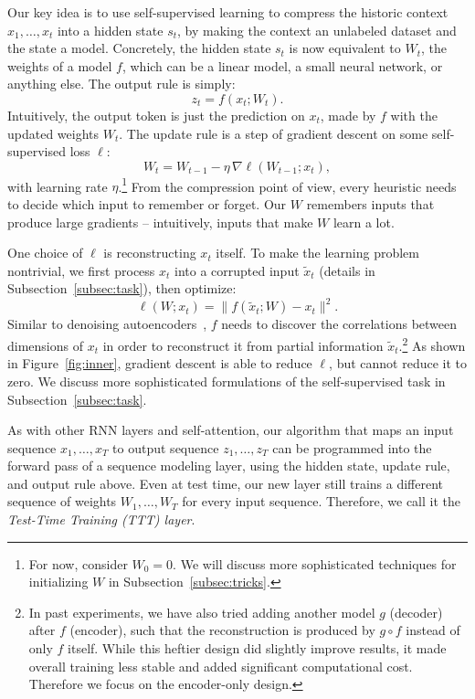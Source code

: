 \documentclass{article}
\begin{document}
Our key idea is to use self-supervised learning to compress the historic context $x_1,\dots,x_t$ into a hidden state $s_t$, by making the context an unlabeled dataset and the state a model.
Concretely, the hidden state $s_t$ is now equivalent to $W_t$, the weights of a model $f$, which can be a linear model, a small neural network, or anything else.
The output rule is simply:
\begin{equation}
\label{eq:output_naive}
z_t = f(x_t; W_t).
\end{equation}
Intuitively, the output token is just the prediction on $x_t$, made by $f$ with the updated weights $W_t$.
The update rule is a step of gradient descent on some self-supervised loss $\ell$: 
\begin{equation}
\label{eq:update_naive}
W_t = W_{t-1} - \eta\,\nabla\ell(W_{t-1}; x_t),
\end{equation}
with learning rate $\eta$.\footnote{\label{footnote:2}
For now, consider $W_0 = 0$. We will discuss more sophisticated techniques for initializing $W$ in Subsection~\ref{subsec:tricks}.}
From the compression point of view, every heuristic needs to decide which input to remember or forget. Our $W$ remembers inputs that produce large gradients -- intuitively, inputs that make $W$ learn a lot.

One choice of $\ell$ is reconstructing $x_t$ itself. 
To make the learning problem nontrivial, we first process $x_t$ into a corrupted input $\tilde{x}_t$ (details in Subsection~\ref{subsec:task}), then optimize:
\begin{equation}
\label{eq:recon}
\ell(W; x_t) = \| f(\tilde{x}_t; W) - x_t \|^2.
\end{equation}
Similar to denoising autoencoders~\cite{denoisingautoencoder}, $f$ needs to discover the correlations between dimensions of $x_t$ in order to reconstruct it from partial information $\tilde{x}_t$.\footnote{\label{footnote:3}
In past experiments, we have also tried adding another model $g$ (decoder) after $f$ (encoder), such that the reconstruction is produced by $g\circ f$ instead of only $f$ itself.
While this heftier design did slightly improve results, it made overall training less stable and added significant computational cost.
Therefore we focus on the encoder-only design.
}
As shown in Figure~\ref{fig:inner}, gradient descent is able to reduce $\ell$, but cannot reduce it to zero.
We discuss more sophisticated formulations of the self-supervised task in Subsection~\ref{subsec:task}.

As with other RNN layers and self-attention, our algorithm that maps an input sequence $x_1,\dots,x_T$ to output sequence $z_1,\dots,z_T$ can be programmed into the forward pass of a sequence modeling layer, using the hidden state, update rule, and output rule above.
Even at test time, our new layer still trains a different sequence of weights $W_1, \dots, W_T$ for every input sequence. Therefore, we call it the \emph{Test-Time Training (TTT) layer}.
\end{document}
